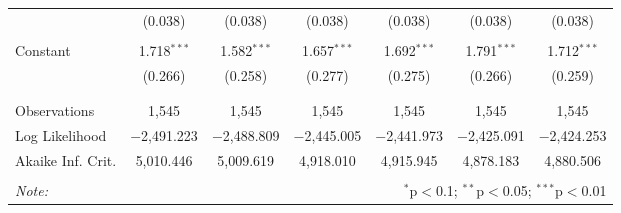 \begin{table}[!htbp]
\begin{tabular}{@{\extracolsep{5pt}}lcccccc}
  & (0.038) & (0.038) & (0.038) & (0.038) & (0.038) & (0.038) \\ 
  & & & & & & \\ 
 Constant & 1.718$^{***}$ & 1.582$^{***}$ & 1.657$^{***}$ & 1.692$^{***}$ & 1.791$^{***}$ & 1.712$^{***}$ \\ 
  & (0.266) & (0.258) & (0.277) & (0.275) & (0.266) & (0.259) \\ 
  & & & & & & \\ 
\hline \\[-1.8ex] 
Observations & 1,545 & 1,545 & 1,545 & 1,545 & 1,545 & 1,545 \\ 
Log Likelihood & $-$2,491.223 & $-$2,488.809 & $-$2,445.005 & $-$2,441.973 & $-$2,425.091 & $-$2,424.253 \\ 
Akaike Inf. Crit. & 5,010.446 & 5,009.619 & 4,918.010 & 4,915.945 & 4,878.183 & 4,880.506 \\ 
\hline 
\hline \\[-1.8ex] 
\textit{Note:}  & \multicolumn{6}{r}{$^{*}$p$<$0.1; $^{**}$p$<$0.05; $^{***}$p$<$0.01} \\ 
\end{tabular} 
\end{table} 
